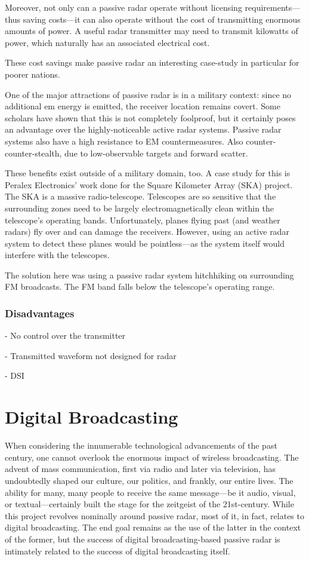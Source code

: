 \documentclass[class=report,11pt,crop=false]{standalone}
\begin{document}
Moreover, not only can a passive radar operate without licensing requirements---thus saving costs---it can also operate without the cost of transmitting enormous amounts of power. A useful radar transmitter may need to transmit kilowatts of power, which naturally has an associated electrical cost.

These cost savings make passive radar an interesting case-study in particular for poorer nations. 

One of the major attractions of passive radar is in a military context: since no additional \gls{em} energy is emitted, the receiver location remains covert. Some scholars have shown that this is not completely foolproof, but it certainly poses an advantage over the highly-noticeable active radar systems. Passive radar systems also have a high resistance to EM countermeasures. Also counter-counter-stealth, due to low-observable targets and forward scatter.

\cite{o2009passive}

These benefits exist outside of a military domain, too. A case study for this is Peralex Electronics' work done for the Square Kilometer Array (SKA) project. The SKA is a massive radio-telescope. Telescopes are so sensitive that the surrounding zones need to be largely electromagnetically clean within the telescope's operating bands. Unfortunately, planes flying past (and weather radars) fly over and can damage the receivers. However, using an active radar system to detect these planes would be pointless---as the system itself would interfere with the telescopes.

The solution here was using a passive radar system hitchhiking on surrounding FM broadcasts. The FM band falls below the telescope's operating range.

\subsubsection{Disadvantages}

- No control over the transmitter

- Transmitted waveform not designed for radar

- DSI

\section{Digital Broadcasting}
When considering the innumerable technological advancements of the past century, one cannot overlook the enormous impact of wireless broadcasting. The advent of mass communication, first via radio and later via television, has undoubtedly shaped our culture, our politics, and frankly, our entire lives. The ability for many, many people to receive the same message---be it audio, visual, or textual---certainly built the stage for the zeitgeist of the 21st-century. While this project revolves nominally around passive radar, most of it, in fact, relates to digital broadcasting. The end goal remains as the use of the latter in the context of the former, but the success of digital broadcasting-based passive radar is intimately related to the success of digital broadcasting itself.
\end{document}
